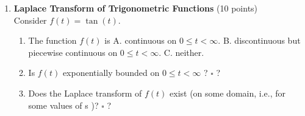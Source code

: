 \begin{enumerate}
\begin{enumerate}[label=(\alph*)]
  \item Evaluate appropriate limits to compute the Laplace transform of $f(t)$ :
  $$
  F(s)=\mathcal{L}\{f(t)\}=\frac{3}{s}
  $$
  \begin{subanswer}
    \[
      F(s)=\lim_{b\to\infty}\Big[-\frac{3}{s}e^{-st}\Big]_{t=0}^{t=b}
      =\lim_{b\to\infty}\left(-\frac{3}{s}e^{-sb}+\frac{3}{s}\right)
      =\frac{3}{s},
    \]
    provided the limit exists.
  \end{subanswer}

  \item Where does the Laplace transform you found exist? In other words, what is the domain of $F(s)$ ?
  \[
    \{\,s\in\mathbb{C}:\operatorname{Re}(s)>0\,\}
  \]
  \begin{subanswer}
    The integral converges when $e^{-\operatorname{Re}(s)\,t}$ decays as $t\to\infty$, i.e. when $\operatorname{Re}(s)>0$. Hence the domain of $F$ is
    \[
      \{s\in\mathbb{C}:\operatorname{Re}(s)>0\},
    \]
    and for such $s$ one has $F(s)=\dfrac{3}{s}$.
  \end{subanswer}
\end{enumerate}








  \item \textbf{Laplace Transform of Trigonometric Functions} (10 points)\\
  Consider $f(t)=\tan (t)$.
  \begin{enumerate}[label=(\alph*)]
    \item The function $f(t)$ is
    A. continuous on $0 \leq t<\infty$.
    B. discontinuous but piecewise continuous on $0 \leq t<\infty$.
    C. neither.
    \begin{subanswer}
    \end{subanswer}
    \item Is $f(t)$ exponentially bounded on $0 \leq t<\infty$ ? $\square$ ?
    \begin{subanswer}
    \end{subanswer}
    \item Does the Laplace transform of $f(t)$ exist (on some domain, i.e., for some values of s )? $\square$ ?
    \begin{subanswer}
    \end{subanswer}
  \end{enumerate}


\end{enumerate}
